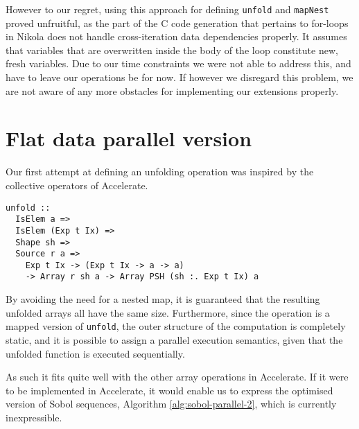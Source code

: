 
However to our regret, using this approach for defining \texttt{unfold} and
\texttt{mapNest} proved unfruitful, as the part of the C code generation that
pertains to for-loops in Nikola does not handle cross-iteration data
dependencies properly. It assumes that variables that are overwritten inside
the body of the loop constitute new, fresh variables. Due to our time
constraints we were not able to address this, and have to leave our operations
be for now. If however we disregard this problem, we are not aware of any more
obstacles for implementing our extensions properly.

\section{Flat data parallel version}

Our first attempt at defining an unfolding operation was inspired by the
collective operators of Accelerate.

\begin{verbatim}
unfold ::
  IsElem a =>
  IsElem (Exp t Ix) =>
  Shape sh =>
  Source r a =>
    Exp t Ix -> (Exp t Ix -> a -> a)
    -> Array r sh a -> Array PSH (sh :. Exp t Ix) a
\end{verbatim}

By avoiding the need for a nested map, it is guaranteed that the resulting
unfolded arrays all have the same size. Furthermore, since the operation is a
mapped version of \texttt{unfold}, the outer structure of the computation is
completely static, and it is possible to assign a parallel execution semantics,
given that the unfolded function is executed sequentially.

As such it fits quite well with the other array operations in Accelerate. If it
were to be implemented in Accelerate, it would enable us to express the
optimised version of Sobol sequences, Algorithm \ref{alg:sobol-parallel-2},
which is currently inexpressible.

